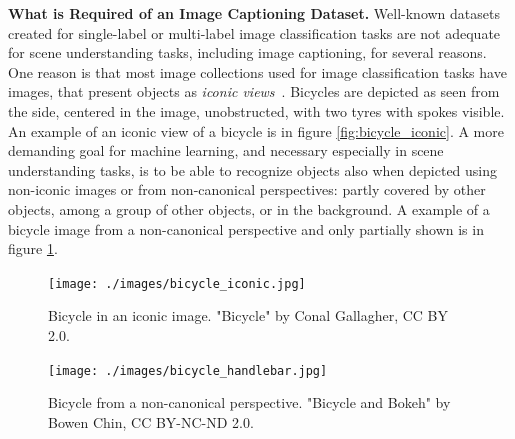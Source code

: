 \documentclass[english,twoside,openright]{HYgraduMLDS}
\begin{document}
\textbf{What is Required of an Image Captioning Dataset.} Well-known datasets created for single-label or multi-label image classification tasks are not adequate for scene understanding tasks, including image captioning, for several reasons. One reason is that most image collections used for image classification tasks have images, that present objects as \textit{iconic views}~\cite{Coco}. Bicycles are depicted as seen from the side, centered in the image, unobstructed, with two tyres with spokes visible. An example of an iconic view of a bicycle is in figure \ref{fig:bicycle_iconic}. A more demanding goal for machine learning, and necessary especially in scene understanding tasks, is to be able to recognize objects also when depicted using non-iconic images or from non-canonical perspectives: partly covered by other objects, among a group of other objects, or in the background. A example of a bicycle image from a non-canonical perspective and only partially shown is in figure \ref{fig:bicycle_non_canonical}.

\begin{figure}
    \centering
    \begin{minipage}{0.45\textwidth}
        \centering
        \texttt{[image: ./images/bicycle\_iconic.jpg]}
        \caption{Bicycle in an iconic image. "Bicycle" by Conal Gallagher, CC BY 2.0.}
        \label{fig:bicycle_iconic} 
    \end{minipage}\hfill
    \begin{minipage}{0.45\textwidth}
        \centering
        \texttt{[image: ./images/bicycle\_handlebar.jpg]}
        \caption{Bicycle from a non-canonical perspective. "Bicycle and Bokeh" by Bowen Chin, CC BY-NC-ND 2.0.}
        \label{fig:bicycle_non_canonical}
    \end{minipage}
\end{figure}
\end{document}
